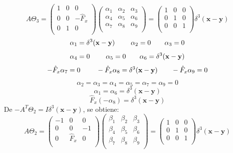 \documentclass[a4paper,12pt]{article}
\begin{document}
\begin{equation}
A\Theta_3=\left(\begin{matrix}
1 & 0 & 0 \\
 0 & 0 & -\hat{F}_x\\
 0 & 1 & 0  \\
\end{matrix}\right)\left(\begin{matrix}
\alpha_1 & \alpha_2 & \alpha_3 \\
 \alpha_4 & \alpha_5 & \alpha_6\\
 \alpha_7 & \alpha_8 & \alpha_9  \\
\end{matrix}\right)=\left(\begin{matrix}
1 & 0 & 0 \\
 0 & 1 & 0\\
 0 &  0& 1  \\
\end{matrix}\right)\delta^3(\textbf{x}-\textbf{y}) 
\end{equation}
\begin{equation}
\alpha_1=\delta^3(\textbf{x}-\textbf{y})  \ \ \  \ \ \ \ \\ \  \alpha_2=0\ \ \ \ \ \ \ \\ \alpha_3=0
\end{equation}
$$\alpha_4=0  \ \ \  \ \ \ \ \\ \  \alpha_5=0\ \ \ \ \ \ \ \\ \alpha_6=\delta^3(\textbf{x}-\textbf{y})$$   
$$-\hat{F}_x\alpha_7=0  \ \ \  \ \ \ \ \\ \  -\hat{F}_x\alpha_8=\delta^3(\textbf{x}-\textbf{y})\ \ \ \ \ \ \ \\ -\hat{F}_x\alpha_9=0$$   
$$\alpha_2=\alpha_3=\alpha_4=\alpha_5=\alpha_7=\alpha_9=0$$
$$\alpha_1=\alpha_6=\delta^3(\textbf{x}-\textbf{y})$$
$$  \hat{F}_x(-\alpha_8)=\delta^3(\textbf{x}-\textbf{y})$$
De $-A^T\Theta_2=I\delta^3(\textbf{x}-\textbf{y})$, se obtiene:
\begin{equation}
A\Theta_2=\left(\begin{matrix}
-1 & 0 & 0 \\
 0 & 0 & -1\\
 0 & \hat{F}_x & 0  \\
\end{matrix}\right)\left(\begin{matrix}
\beta_1 & \beta_2 & \beta_3 \\
 \beta_4 & \beta_5 & \beta_6\\
 \beta_7 & \beta_8 & \beta_9  \\
\end{matrix}\right)=\left(\begin{matrix}
1 & 0 & 0 \\
 0 & 1 & 0\\
 0 &  0& 1  \\
\end{matrix}\right)\delta^3(\textbf{x}-\textbf{y}) 
\end{equation}
\end{document}
